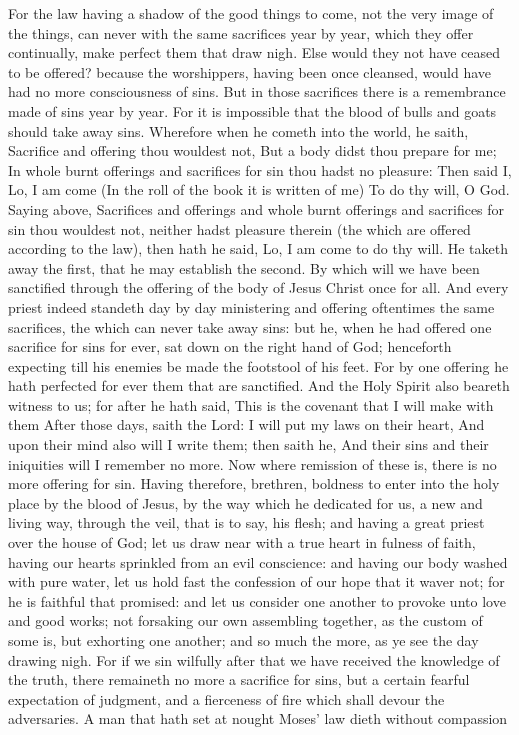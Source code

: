 For the law having a shadow of the good things to come, not the very image of the things, can never with the same sacrifices year by year, which they offer continually, make perfect them that draw nigh. Else would they not have ceased to be offered? because the worshippers, having been once cleansed, would have had no more consciousness of sins. But in those sacrifices there is a remembrance made of sins year by year. For it is impossible that the blood of bulls and goats should take away sins. Wherefore when he cometh into the world, he saith, Sacrifice and offering thou wouldest not, But a body didst thou prepare for me;  In whole burnt offerings and sacrifices for sin thou hadst no pleasure:  Then said I, Lo, I am come (In the roll of the book it is written of me) To do thy will, O God.  Saying above, Sacrifices and offerings and whole burnt offerings and sacrifices for sin thou wouldest not, neither hadst pleasure therein (the which are offered according to the law), then hath he said, Lo, I am come to do thy will. He taketh away the first, that he may establish the second. By which will we have been sanctified through the offering of the body of Jesus Christ once for all. And every priest indeed standeth day by day ministering and offering oftentimes the same sacrifices, the which can never take away sins: but he, when he had offered one sacrifice for sins for ever, sat down on the right hand of God; henceforth expecting till his enemies be made the footstool of his feet. For by one offering he hath perfected for ever them that are sanctified. And the Holy Spirit also beareth witness to us; for after he hath said,  This is the covenant that I will make with them After those days, saith the Lord: I will put my laws on their heart, And upon their mind also will I write them; then saith he,  And their sins and their iniquities will I remember no more.  Now where remission of these is, there is no more offering for sin.  Having therefore, brethren, boldness to enter into the holy place by the blood of Jesus, by the way which he dedicated for us, a new and living way, through the veil, that is to say, his flesh; and having a great priest over the house of God; let us draw near with a true heart in fulness of faith, having our hearts sprinkled from an evil conscience: and having our body washed with pure water, let us hold fast the confession of our hope that it waver not; for he is faithful that promised: and let us consider one another to provoke unto love and good works; not forsaking our own assembling together, as the custom of some is, but exhorting one another; and so much the more, as ye see the day drawing nigh.  For if we sin wilfully after that we have received the knowledge of the truth, there remaineth no more a sacrifice for sins, but a certain fearful expectation of judgment, and a fierceness of fire which shall devour the adversaries. A man that hath set at nought Moses’ law dieth without compassion 